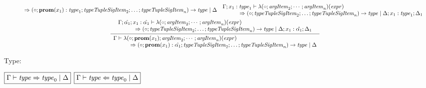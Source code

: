 \begin{gather*}
{\begin{array}{l}
      \hspace{3em}\Rightarrow (\circ; \mathbf{prom}(x_1): \mathit{type}_1; \mathit{typeTupleSigItem}_2; \ldots; \mathit{typeTupleSigItem}_n) \rightarrow \mathit{type} \mid \Delta
    \end{array}
  }{
    \begin{array}{l}
      \Gamma; x_1: \mathit{type}_1 \vdash \lambda(\circ; \mathit{argItem}_2; \cdots; \mathit{argItem}_n)(\mathit{expr})
      \\
      \hspace{3em}\Rightarrow (\circ; \mathit{typeTupleSigItem}_2; \ldots; \mathit{typeTupleSigItem}_n) \rightarrow \mathit{type} \mid \Delta; x_1: \mathit{type}_1; \Delta_1
    \end{array}
  }
  \\
  \infer{
    \begin{array}{l}
      \Gamma \vdash \lambda(\circ; \mathbf{prom}(x_1); \mathit{argItem}_2; \cdots; \mathit{argItem}_n)(\mathit{expr})
      \\
      \hspace{3em}\Rightarrow (\circ; \mathbf{prom}(x_1): \hat{\alpha_1}; \mathit{typeTupleSigItem}_2; \ldots; \mathit{typeTupleSigItem}_n) \rightarrow \mathit{type} \mid \Delta
    \end{array}
  }{
    \begin{array}{l}
      \Gamma; \hat{\alpha_1}; x_1: \hat{\alpha_1} \vdash \lambda(\circ; \mathit{argItem}_2; \cdots; \mathit{argItem}_n)(\mathit{expr})
      \\
      \hspace{3em}\Rightarrow (\circ; \mathit{typeTupleSigItem}_2; \ldots; \mathit{typeTupleSigItem}_n) \rightarrow \mathit{type} \mid \Delta; x_1: \hat{\alpha_1}; \Delta_1
    \end{array}
  }
\end{gather*}

Type:

$\fbox{$\Gamma \vdash \mathit{type} \Rightarrow \mathit{type}_0 \mid \Delta$}$
$\fbox{$\Gamma \vdash \mathit{type} \Leftarrow \mathit{type}_0 \mid \Delta$}$

